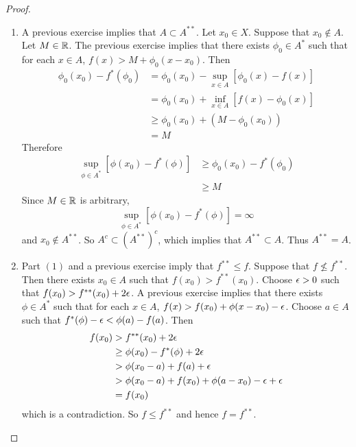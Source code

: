 \documentclass{book}
\begin{document}
	\begin{proof}\
		\begin{enumerate}
			\item A previous exercise implies that $A \subset A^{**}$. Let $x_0 \in X$. Suppose that $x_0 \not \in A$. Let $M \in \mathbb{R}$. The previous exercise implies that there exists $\phi_0 \in A^*$ such that for each $x \in A$, $f(x) > M + \phi_0(x - x_0)$. Then 
			\begin{align*}
				\phi_0(x_0) - f^*(\phi_0) 
				&= \phi_0(x_0) - \sup_{x \in A}[\phi_0(x) - f(x)] \\
				&= \phi_0(x_0) + \inf_{x \in A}[f(x) - \phi_0(x)] \\
				& \geq \phi_0(x_0) + (M - \phi_0(x_0)) \\
				&= M
			\end{align*}
		Therefore 
		\begin{align*}
			\sup\limits_{\phi \in A^*}[\phi(x_0) - f^*(\phi)] 
			& \geq \phi_0(x_0) - f^*(\phi_0) \\
			& \geq M
		\end{align*}
		Since $M \in \mathbb{R}$ is arbitrary, $$\sup\limits_{\phi \in A^*}[\phi(x_0) - f^*(\phi)] = \infty $$ and $x_0 \not \in A^{**}$. So $A^c \subset (A^{**})^c$, which implies that $A^{**} \subset A$. Thus $A^{**} = A$.
		\item Part $(1)$ and a previous exercise imply that $f^{**} \leq f$. Suppose that $f \not \leq f^{**}$. Then there exists $x_0 \in A$ such that $f(x_0) > f^{**}(x_0)$. Choose $\epsilon > 0$ such that $f(x_0) > f^{**}(x_0) + 2 \epsilon$. A previous exercise implies that there exists $\phi \in A^*$ such that for each $x \in A$, $f(x) > f(x_0) + \phi(x - x_0) - \epsilon$. Choose $a \in A$ such that $f^*(\phi) - \epsilon < \phi(a) - f(a)$. Then 
		\begin{align*}
			f(x_0)
			& > f^{**}(x_0) + 2 \epsilon \\
			& \geq \phi(x_0) - f^*(\phi) + 2 \epsilon \\
			& > \phi(x_0 -a) + f(a) + \epsilon \\
			& > \phi(x_0 -a) + f(x_0) + \phi(a - x_0) - \epsilon + \epsilon \\
			&= f(x_0) 
		\end{align*}
		which is a contradiction. So $f \leq f^{**}$ and hence $f = f^{**}$. 
		\end{enumerate}
		
	\end{proof}
	

	
	
\end{document}
